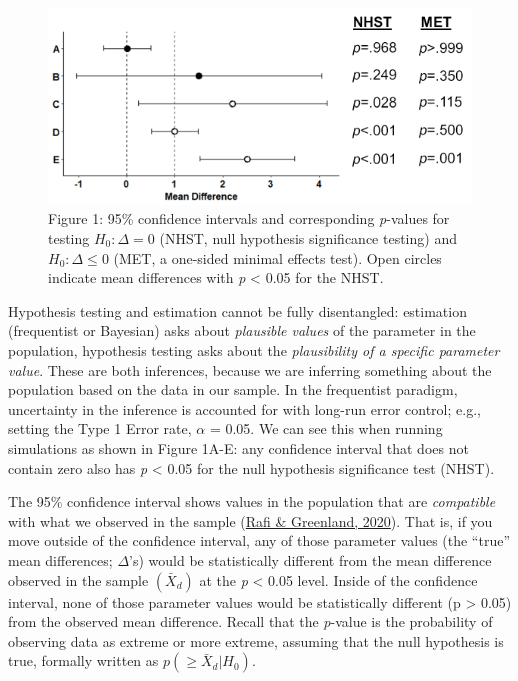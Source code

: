 \documentclass[]{cik}%
\begin{document}
\begin{figure}[H]

{\centering \includegraphics[width=0.8\linewidth]{figs/fig1} 

}

\caption{Figure 1: 95\% confidence intervals and corresponding \emph{p}-values for testing $H_{0}: \Delta = 0$ (NHST, null hypothesis significance testing) and $H_{0}: \Delta \leq 0$ (MET, a one-sided minimal effects test). Open circles indicate mean differences with \emph{p} < 0.05 for the NHST.}\label{fig:fig1pdf}
\end{figure}

Hypothesis testing and estimation cannot be fully disentangled:
estimation (frequentist or Bayesian) asks about \emph{plausible values}
of the parameter in the population, hypothesis testing asks about the
\emph{plausibility of a specific parameter value}. These are both
inferences, because we are inferring something about the population
based on the data in our sample. In the frequentist paradigm,
uncertainty in the inference is accounted for with long-run error
control; e.g., setting the Type 1 Error rate, \(\alpha\) = 0.05. We can
see this when running simulations as shown in Figure 1A-E: any
confidence interval that does not contain zero also has \emph{p}
\textless{} 0.05 for the null hypothesis significance test (NHST).

The 95\% confidence interval shows values in the population that are
\emph{compatible} with what we observed in the sample
(\protect\hyperlink{ref-3}{Rafi \& Greenland, 2020}). That is, if you
move outside of the confidence interval, any of those parameter values
(the ``true'' mean differences; \(\Delta\)'s) would be statistically
different from the mean difference observed in the sample
\((\bar{X}_{d})\) at the \emph{p} \textless{} 0.05 level. Inside of the
confidence interval, none of those parameter values would be
statistically different (p \textgreater{} 0.05) from the observed mean
difference. Recall that the \emph{p}-value is the probability of
observing data as extreme or more extreme, assuming that the null
hypothesis is true, formally written as \(p(\geq\bar{X}_d|H_{0})\).
\end{document}
